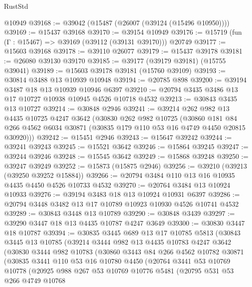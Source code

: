 \begin{lexlean}{RustStd}
\begin{coremodule}
    @10949
@39168 := @39042 (@15487 (@26007 (@39124 (@15496 @10950))))
@39169 := @15437 @39168
@39170 := @39154 @10949
@39176 := @15719 (fun (Γ : @15467) => @39169 (@39112 (@39131 @39170))) @20749
@39177 := @15603 @39168
@39178 := @39110 @26077
@39179 := @15437 @39178
@39181 := @26080 @39130 @39170
@39185 := @39177 (@39179 @39181) (@15755 @39041)
@39189 := @15603 @39178 @39181 (@15760 @39109)
@39193 := @30814 @3488 @13 @10939 @10948
@39194 := @20785 @898
@39200 := @39194 @3487 @18 @13 @10939 @10946 @6397
@39210 := @20794 @3435 @3486 @13 @17 @10727 @10938 @10945 @4526 @10718 @4532
@39213 := @30843 @3435 @13 @10727
@39214 := @30848 @2946
@39241 := @39214
    @262
    @982
    @13
    @4435
    @10725
    @4247
    @3642
    (@30830
      @262
      @982
      @10725
      (@30860
        @181
        @84
        @266
        @4562
        @6034
        @30871
        (@30835 @179 @110 @53 @16 @4749 @4450 @20815 @30920)))
@39242 := @15451 @2946
@39243 := @15647 @39242
@39244 := @39241 @39243
@39245 := @15521 @3642
@39246 := @15864 @39245
@39247 := @39244 @39246
@39248 := @15545 @3642
@39249 := @15868 @39248
@39250 := @39247 @39249
@39252 := @15873 (@15875 @2946)
@39256 := @39210 (@39213 (@39250 @39252 @15884))
@39266 := @20794 @3484 @110 @13 @16 @10935 @4435 @4450 @4526 @10733 @4532
@39270 := @20764 @3484 @13 @10924 @10933
@39276 := @39194 @3483 @18 @13 @10924 @10931 @6397
@39286 := @20794 @3448 @3482 @13 @17 @10789 @10923 @10930 @4526 @10741 @4532
@39289 := @30843 @3448 @13 @10789
@39290 := @30848 @3439
@39297 := @39290 @3447 @18 @13 @4435 @10787 @4247 @3649
@39300 := @30830 @3447 @18 @10787
@39394 := @30835
    @3445
    @689
    @13
    @17
    @10785
    @5813
    (@30843
      @3445
      @13
      @10785
      (@39214
        @3444
        @982
        @13
        @4435
        @10783
        @4247
        @3642
        (@30830
          @3444
          @982
          @10783
          (@30860
            @3443
            @84
            @266
            @4562
            @10782
            @30871
            (@30835
              @3441
              @110
              @53
              @16
              @10780
              @4450
              (@20764
                @3441
                @53
                @10769
                @10778
                (@20925
                  @988
                  @267
                  @53
                  @10769
                  @10776
                  @5481
                  (@20795
                    @531
                    @53
                    @266
                    @4749
                    @10768

\end{coremodule}
\end{lexlean}
